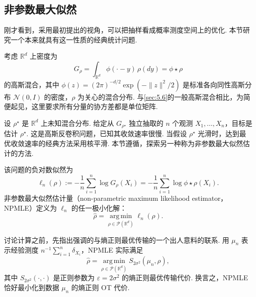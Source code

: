 \subsection{非参数最大似然}\label{sec:6.4}

刚才看到，采用\cite{ref170,ref324}最初提出的视角，可以把抽样看成概率测度空间上的优化. 本节研究一个本来就具有这一性质的经典统计问题.

考虑 $\mathbb R^d$ 上密度为
$$
G_\rho=\int_{\mathbb R^d}\phi(\cdot-y)\,\rho(dy)=\phi\star\rho
$$
的高斯混合，其中 $\phi(z)=(2\pi)^{-d/2}\exp(-\|z\|^2/2)$ 是标准各向同性高斯分布 $\mathcal N(0,I)$ 的密度，$\rho$ 为关心的混合分布. 与\autoref{sec:5.6}的一般高斯混合相比，为简便起见，这里要求所有分量的协方差都是单位矩阵.

设 $\rho^\star$ 是 $\mathbb R^d$ 上未知混合分布. 给定从 $G_{\rho^\star}$ 独立抽取的 $n$ 个观测 $X_1,\ldots,X_n$，目标是估计 $\rho^\star$. 这是高斯反卷积问题，已知其收敛速率很慢\cite{ref271}. 当假设 $\rho^\star$ 光滑时，达到最优收敛速率的经典方法采用核平滑\cite{ref129}. 本节遵循\cite{ref327}，探索另一种称为非参数最大似然估计的方法.

该问题的负对数似然为
$$
\ell_n(\rho):=-\frac1n\sum_{i=1}^n\log G_\rho(X_i)
=-\frac1n\sum_{i=1}^n\log\phi\star\rho(X_i).
$$
非参数最大似然估计量（non-parametric maximum likelihood estimator，NPMLE）定义为 $\ell_n$ 的任一极小化解：
\begin{equation}\label{eq:6.20}
\widehat\rho=\operatorname*{arg\,min}_{\rho\in\mathcal P(\mathbb R^d)}\ell_n(\rho).
\end{equation}

讨论计算之前，先指出\cite{ref270}强调的与熵正则最优传输的一个出人意料的联系. 用 $\mu_n$ 表示经验测度 $n^{-1}\sum_{i=1}^n\delta_{X_i}$，NPMLE 实际满足
\begin{equation}\label{eq:6.21}
\widehat\rho=\operatorname*{arg\,min}_{\rho\in\mathcal P(\mathbb R^d)}S_{2\sigma^2}(\mu_n,\rho),
\end{equation}
其中 $S_{2\sigma^2}(\cdot,\cdot)$ 是正则参数为 $\varepsilon=2\sigma^2$ 的熵正则最优传输代价. 换言之，NPMLE 恰好最小化到数据 $\mu_n$ 的熵正则 OT 代价.


